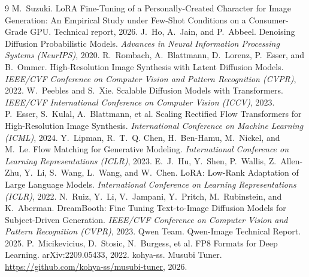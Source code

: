\documentclass[10pt,twocolumn]{article}
\begin{document}
\begin{thebibliography}{9}
 M.~Suzuki. LoRA Fine-Tuning of a Personally-Created Character for Image Generation: An Empirical Study under Few-Shot Conditions on a Consumer-Grade GPU. Technical report, 2026.
 J.~Ho, A.~Jain, and P.~Abbeel. Denoising Diffusion Probabilistic Models. \textit{Advances in Neural Information Processing Systems (NeurIPS)}, 2020.
 R.~Rombach, A.~Blattmann, D.~Lorenz, P.~Esser, and B.~Ommer. High-Resolution Image Synthesis with Latent Diffusion Models. \textit{IEEE/CVF Conference on Computer Vision and Pattern Recognition (CVPR)}, 2022.
 W.~Peebles and S.~Xie. Scalable Diffusion Models with Transformers. \textit{IEEE/CVF International Conference on Computer Vision (ICCV)}, 2023.
 P.~Esser, S.~Kulal, A.~Blattmann, et al. Scaling Rectified Flow Transformers for High-Resolution Image Synthesis. \textit{International Conference on Machine Learning (ICML)}, 2024.
 Y.~Lipman, R.~T.~Q. Chen, H.~Ben-Hamu, M.~Nickel, and M.~Le. Flow Matching for Generative Modeling. \textit{International Conference on Learning Representations (ICLR)}, 2023.
 E.~J.~Hu, Y.~Shen, P.~Wallis, Z.~Allen-Zhu, Y.~Li, S.~Wang, L.~Wang, and W.~Chen. LoRA: Low-Rank Adaptation of Large Language Models. \textit{International Conference on Learning Representations (ICLR)}, 2022.
 N.~Ruiz, Y.~Li, V.~Jampani, Y.~Pritch, M.~Rubinstein, and K.~Aberman. DreamBooth: Fine Tuning Text-to-Image Diffusion Models for Subject-Driven Generation. \textit{IEEE/CVF Conference on Computer Vision and Pattern Recognition (CVPR)}, 2023.
 Qwen Team. Qwen-Image Technical Report. 2025.
 P.~Micikevicius, D.~Stosic, N.~Burgess, et al. FP8 Formats for Deep Learning. arXiv:2209.05433, 2022.
 kohya-ss. Musubi Tuner. \url{https://github.com/kohya-ss/musubi-tuner}, 2026.
\end{thebibliography}
\end{document}
